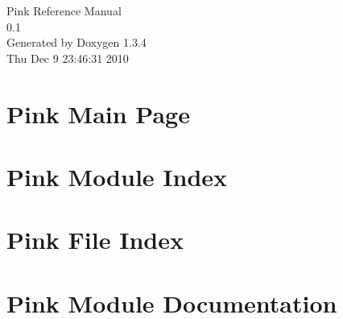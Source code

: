 \documentclass[a4paper]{book}
\begin{document}
\begin{titlepage}
\vspace*{7cm}
\begin{center}
{\Large Pink Reference Manual\\[1ex]\large 0.1 }\\
\vspace*{1cm}
{\large Generated by Doxygen 1.3.4}\\
\vspace*{0.5cm}
{\small Thu Dec 9 23:46:31 2010}\\
\end{center}
\end{titlepage}
\clearemptydoublepage
{}
\tableofcontents
\clearemptydoublepage
{}
\chapter{Pink Main Page}
\label{index}
\chapter{Pink Module Index}

\chapter{Pink File Index}

\chapter{Pink Module Documentation}














\end{document}
